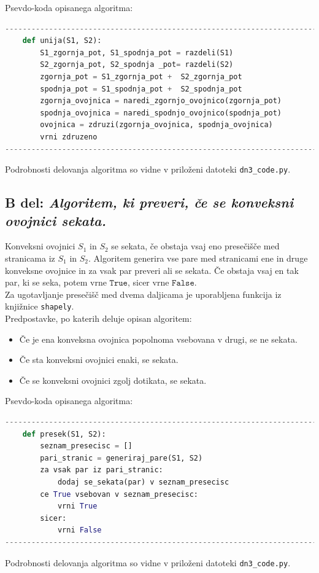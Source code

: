 \documentclass[a4paper,11pt]{article}
\begin{document}
Psevdo-koda opisanega algoritma:
\begin{lstlisting}[language=Python]
-----------------------------------------------------------------------
    def unija(S1, S2):
        S1_zgornja_pot, S1_spodnja_pot = razdeli(S1)
        S2_zgornja_pot, S2_spodnja _pot= razdeli(S2)
        zgornja_pot = S1_zgornja_pot +  S2_zgornja_pot
        spodnja_pot = S1_spodnja_pot +  S2_spodnja_pot
        zgornja_ovojnica = naredi_zgornjo_ovojnico(zgornja_pot)
        spodnja_ovojnica = naredi_spodnjo_ovojnico(spodnja_pot)
        ovojnica = zdruzi(zgornja_ovojnica, spodnja_ovojnica)
        vrni zdruzeno
-----------------------------------------------------------------------
\end{lstlisting}
Podrobnosti delovanja algoritma so vidne v priloženi datoteki \texttt{dn3\_code.py}.

\subsection*{B del: \textit{Algoritem, ki preveri, če se konveksni ovojnici sekata.}}
Konveksni ovojnici $S_1$ in $S_2$ se sekata, če obstaja vsaj eno presečišče med stranicama iz $S_1$ in $S_2$. 
Algoritem generira vse pare med stranicami ene in druge konveksne ovojnice in za vsak par preveri ali se sekata. 
Če obstaja vsaj en tak par, ki se seka, potem vrne $\texttt{True}$, sicer vrne $\texttt{False}$.
\\
Za ugotavljanje presečišč med dvema daljicama je uporabljena funkcija iz knjižnice \texttt{shapely}.
\\
Predpostavke, po katerih deluje opisan algoritem:
\begin{itemize}
    \item Če je ena konveksna ovojnica popolnoma vsebovana v drugi, se ne sekata.
    \item Če sta konveksni ovojnici enaki, se sekata.
    \item Če se konveksni ovojnici zgolj dotikata, se sekata.
\end{itemize}
Psevdo-koda opisanega algoritma:
\begin{lstlisting}[language=Python]
-----------------------------------------------------------------------
    def presek(S1, S2):
        seznam_presecisc = []
        pari_stranic = generiraj_pare(S1, S2)
        za vsak par iz pari_stranic:
            dodaj se_sekata(par) v seznam_presecisc
        ce True vsebovan v seznam_presecisc:
            vrni True
        sicer: 
            vrni False         
-----------------------------------------------------------------------
\end{lstlisting}
Podrobnosti delovanja algoritma so vidne v priloženi datoteki \texttt{dn3\_code.py}.
\end{document}
